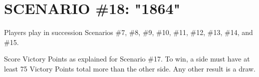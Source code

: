 \section{SCENARIO \#18: "1864"
}


Players play in succession Scenarios \#7, \#8, \#9, \#10, \#11, \#12, \#13, \#14, and \#15.

Score Victory Points as explained for Scenario \#17. To win, a side must have at least 75 Victory Points total more than the other side. Any other result is a draw.

